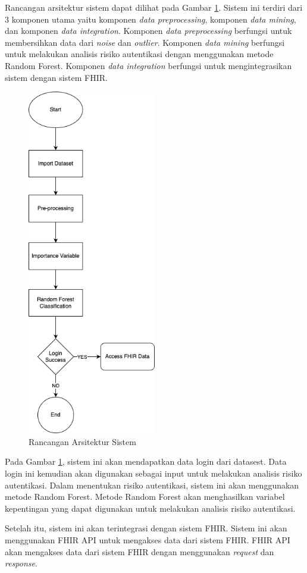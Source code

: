 Rancangan arsitektur sistem dapat dilihat pada Gambar \ref{fig:arsitektur-sistem}. Sistem ini terdiri dari 3 komponen utama yaitu komponen \textit{data preprocessing}, komponen \textit{data mining}, dan komponen \textit{data integration}. Komponen \textit{data preprocessing} berfungsi untuk membersihkan data dari \textit{noise} dan \textit{outlier}. Komponen \textit{data mining} berfungsi untuk melakukan analisis risiko autentikasi dengan menggunakan metode Random Forest. Komponen \textit{data integration} berfungsi untuk mengintegrasikan sistem dengan sistem FHIR.

\begin{figure}[H]
    \centering
    \includegraphics[width=0.5\textwidth]{BAB_TESIS/IMAGES/diagram-khusus.png}
    \caption{Rancangan Arsitektur Sistem}
    \label{fig:arsitektur-sistem}
\end{figure}

Pada Gambar \ref{fig:arsitektur-sistem}, sistem ini akan mendapatkan data login dari datasest. Data login ini kemudian akan digunakan sebagai input untuk melakukan analisis risiko autentikasi. Dalam menentukan risiko autentikasi, sistem ini akan menggunakan metode Random Forest. Metode Random Forest akan menghasilkan variabel kepentingan yang dapat digunakan untuk melakukan analisis risiko autentikasi.

Setelah itu, sistem ini akan terintegrasi dengan sistem FHIR. Sistem ini akan menggunakan FHIR API untuk mengakses data dari sistem FHIR. FHIR API akan mengakses data dari sistem FHIR dengan menggunakan \textit{request} dan \textit{response}.